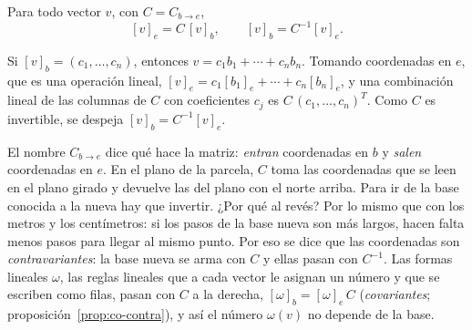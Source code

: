 \begin{proposicion}\label{prop:cb-coordenadas}
Para todo vector \(v\), con \(C=C_{b\to e}\),
\[
  [v]_e=C\,[v]_b,\qquad [v]_b=C^{-1}[v]_e .
\]
\end{proposicion}

\begin{demostracion}
Si \([v]_b=(c_1,\dots,c_n)\), entonces \(v=c_1b_1+\cdots+c_nb_n\). Tomando coordenadas en
\(e\), que es una operación lineal, \([v]_e=c_1[b_1]_e+\cdots+c_n[b_n]_e\), y una combinación
lineal de las columnas de \(C\) con coeficientes \(c_j\) es \(C\,(c_1,\dots,c_n)^T\).
Como \(C\) es invertible, se despeja \([v]_b=C^{-1}[v]_e\).
\end{demostracion}

El nombre \(C_{b\to e}\) dice qué hace la matriz: \emph{entran} coordenadas en \(b\) y
\emph{salen} coordenadas en \(e\). En el plano de la parcela, \(C\) toma las coordenadas que
se leen en el plano girado y devuelve las del plano con el norte arriba. Para ir de la base
conocida a la nueva hay que invertir. ¿Por qué al revés? Por lo mismo que con los metros y los
centímetros: si los pasos de la base nueva son más largos, hacen falta menos pasos para llegar
al mismo punto. Por eso se dice que las
coordenadas son \emph{contravariantes}: la base nueva se arma con \(C\) y ellas pasan con
\(C^{-1}\). Las formas lineales \(\omega\), las reglas lineales que a cada vector le asignan un
número y que se escriben como filas, pasan con \(C\) a la derecha,
\([\omega]_b=[\omega]_e\,C\) (\emph{covariantes}; proposición~\ref{prop:co-contra}), y así el
número \(\omega(v)\) no depende de la base.

